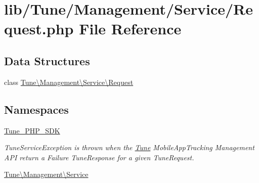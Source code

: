 \hypertarget{Request_8php}{\section{lib/\-Tune/\-Management/\-Service/\-Request.php File Reference}
\label{Request_8php}
}
\subsection*{Data Structures}
\begin{DoxyCompactItemize}
\item 
class \hyperlink{classTune_1_1Management_1_1Service_1_1Request}{Tune\textbackslash{}\-Management\textbackslash{}\-Service\textbackslash{}\-Request}
\end{DoxyCompactItemize}
\subsection*{Namespaces}
\begin{DoxyCompactItemize}
\item 
\hyperlink{namespaceTune__PHP__SDK}{Tune\-\_\-\-P\-H\-P\-\_\-\-S\-D\-K}
\begin{DoxyCompactList}\small\item\em Tune\-Service\-Exception is thrown when the \hyperlink{namespaceTune}{Tune} Mobile\-App\-Tracking Management A\-P\-I return a Failure Tune\-Response for a given Tune\-Request. \end{DoxyCompactList}\item 
\hyperlink{namespaceTune_1_1Management_1_1Service}{Tune\textbackslash{}\-Management\textbackslash{}\-Service}
\end{DoxyCompactItemize}
